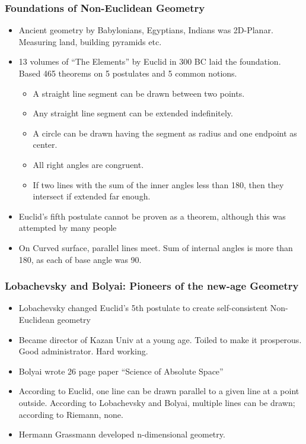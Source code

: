 \begin{frame}[fragile]
\frametitle{Foundations of Non-Euclidean Geometry}
\begin{itemize}
\item Ancient geometry by Babylonians, Egyptians, Indians was 2D-Planar. Measuring land, building pyramids etc.
\item 13 volumes of ``The Elements'' by Euclid in 300 BC laid the foundation. Based 465 theorems on 5 postulates and 5 common notions. %
	\begin{itemize}
	\item[1.] A straight line segment can be drawn between two points.
	\item[2.] Any straight line segment can be extended indefinitely.
	\item[3.] A circle can be drawn having the segment as radius and one endpoint as center.
	\item [4.] All right angles are congruent.
	\item [5.] If two lines with the sum of the inner angles less than 180, then they intersect if extended far enough.
	\end{itemize}
\item 
Euclid's fifth postulate cannot be proven as a theorem, although this was attempted by many people
\item On Curved surface, parallel lines meet. Sum of internal angles is more than 180, as each of base angle was 90.
\end{itemize}
\end{frame}

\begin{frame}[fragile]
\frametitle{Lobachevsky and Bolyai: Pioneers of the new-age Geometry}
\begin{itemize}
\item Lobachevsky changed Euclid's 5th postulate to create self-consistent Non-Euclidean geometry
\item Became director of Kazan Univ at a young age. Toiled to make it prosperous. Good administrator. Hard working.
\item  Bolyai wrote 26 page paper ``Science of Absolute Space''
\item According to Euclid, one line can be drawn parallel to a given line at a point outside. According to Lobachevsky and Bolyai, multiple lines can be drawn; according to Riemann, none.
\item Hermann Grassmann developed n-dimensional geometry.
\end{itemize}
\end{frame}



